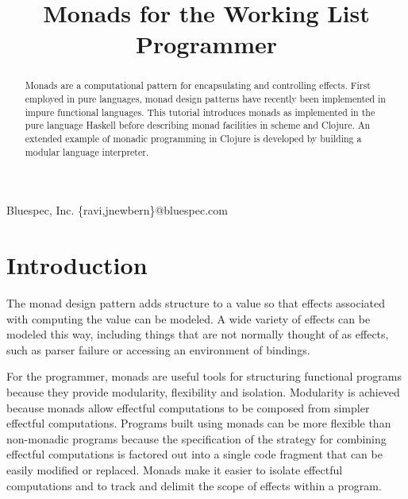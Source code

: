 \documentclass[preprint,natbib,10pt]{sigplanconf}
\begin{document}
\copyrightdata{[to be supplied]}


\title{Monads for the Working List Programmer}

           {Bluespec, Inc.}
           {\{ravi,jnewbern\}@bluespec.com}

\maketitle

\begin{abstract}

Monads are a computational pattern for encapsulating and controlling
effects.  First employed in pure languages, monad design patterns have
recently been implemented in impure functional languages.  This
tutorial introduces monads as implemented in the pure language Haskell
before describing monad facilities in scheme and Clojure.  An extended
example of monadic programming in Clojure is developed by building a
modular language interpreter.

\end{abstract}




\section{Introduction}

The monad design pattern adds structure to a value so that effects
associated with computing the value can be modeled.  A wide variety of
effects can be modeled this way, including things that are not
normally thought of as effects, such as parser failure or accessing an
environment of bindings.

For the programmer, monads are useful tools for structuring functional
programs because they provide modularity, flexibility and isolation.
Modularity is achieved because monads allow effectful computations to
be composed from simpler effectful computations.  Programs built using
monads can be more flexible than non-monadic programs because the
specification of the strategy for combining effectful computations is
factored out into a single code fragment that can be easily modified
or replaced.  Monads make it easier to isolate effectful computations
and to track and delimit the scope of effects within a program.
\end{document}
